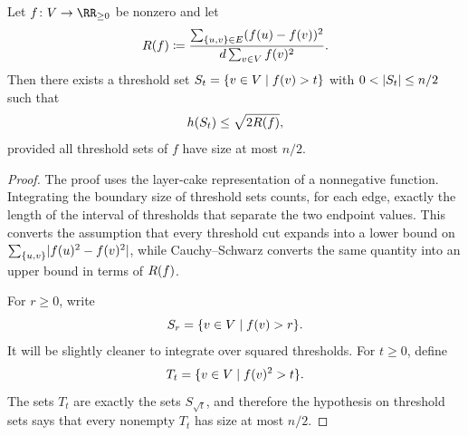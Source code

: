 \begin{lemma}
	\label{lem:sweep}
	Let \(f\colon \Vertices\to\RR_{\geq 0}\) be nonzero and let
	\begin{equation}
		R(f)\coloneqq \frac{\sum_{\{u,v\}\in E}(f(u)-f(v))^2}{d\sum_{v\in V}f(v)^2}.
	\end{equation}
	Then there exists a threshold set \(S_t=\{v\in V\mid f(v)>t\}\) with \(0<\lvert S_t\rvert\leq n/2\) such that
	\begin{equation}
		h(S_t)\leq \sqrt{2R(f)},
	\end{equation}
	provided all threshold sets of \(f\) have size at most \(n/2\).
\end{lemma}

\begin{proof}
	The proof uses the layer-cake representation of a nonnegative function. Integrating the boundary size of threshold sets counts, for each edge, exactly the length of the interval of thresholds that separate the two endpoint values. This converts the assumption that every threshold cut expands into a lower bound on \(\sum_{\{u,v\}}\lvert f(u)^2-f(v)^2\rvert\), while Cauchy--Schwarz converts the same quantity into an upper bound in terms of \(R(f)\).

	For \(r\geq 0\), write
	\begin{equation}
		S_r=\{v\in V\mid f(v)>r\}.
	\end{equation}
	It will be slightly cleaner to integrate over squared thresholds. For \(t\geq 0\), define
	\begin{equation}
		T_t=\{v\in V\mid f(v)^2>t\}.
	\end{equation}
	The sets \(T_t\) are exactly the sets \(S_{\sqrt{t}}\), and therefore the hypothesis on threshold sets says that every nonempty \(T_t\) has size at most \(n/2\).


\end{proof}
